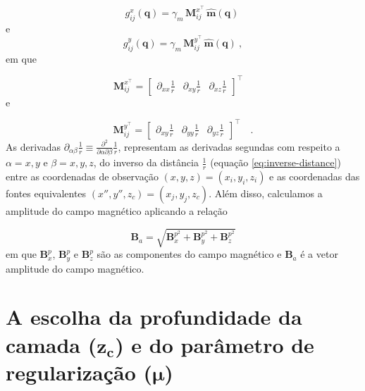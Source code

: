 \begin{equation}
g_{ij}^{x}(\mathbf{q})  = \gamma_m \, \mathbf{M}_{ij}^{x^\top} \, \hat{\mathbf{m}}(\mathbf{q}) \: 
\label{eq:g_ij-x}
\end{equation}
e 
\begin{equation}
g_{ij}^{y}(\mathbf{q})  = \gamma_m \, \mathbf{M}_{ij}^{y^\top} \, \hat{\mathbf{m}}(\mathbf{q}) \: ,
\label{eq:g_ij-y}
\end{equation}
em que 

\begin{equation}
\mathbf{M}_{ij}^{x^\top} = \begin{bmatrix}
\partial_{xx} \frac{1}{r} & 
\partial_{xy} \frac{1}{r} &
\partial_{xz} \frac{1}{r}
\end{bmatrix}^\top \quad 
\label{eq:Mij-matrix-x}
\end{equation}
e 

\begin{equation}
\mathbf{M}_{ij}^{y^\top} = \begin{bmatrix}
\partial_{xy} \frac{1}{r} & 
\partial_{yy} \frac{1}{r} &
\partial_{yz} \frac{1}{r}
\end{bmatrix}^\top \quad .
\label{eq:Mij-matrix-y}
\end{equation}
As derivadas $\partial_{\alpha\beta} \frac{1}{r} \equiv \frac{\partial^{2}}{\partial \alpha \partial \beta} \frac{1}{r}$, representam as derivadas segundas com respeito a $\alpha = x, y$ e $\beta = x, y, z$, do inverso da distância $\frac{1}{r}$ (equação \ref{eq:inverse-distance}) entre as coordenadas de observação $(x, y, z) = (x_{i}, y_{i}, z_{i})$ e as coordenadas das fontes equivalentes $(x'', y'', z_{c}) = (x_{j}, y_{j}, z_{c})$. Além disso, calculamos a amplitude do campo magnético aplicando a relação

\begin{equation}
\mathbf{B}_a = \sqrt{ \mathbf{B}_{x}^{p^2} + \mathbf{B}_{y}^{p^2} + \mathbf{B}_{z}^{p^2}}   
\label{eq:amplitude_field}
\end{equation}
em que $\mathbf{B}_{x}^{p}$, $\mathbf{B}_{y}^{p}$ e $\mathbf{B}_{z}^{p}$ são as componentes do campo magnético e $\mathbf{B}_a$ é a vetor amplitude do campo magnético. 

\section{A escolha da profundidade da camada ($\mathbf{z_{c}}$) e do parâmetro de regularização ($\mathbf{\mu}$)}


